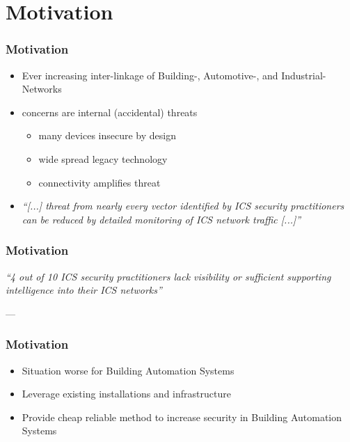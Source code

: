 
\section{Motivation}
\begin{frame}[c]
	\frametitle{Motivation}
	\begin{itemize}
		\item Ever increasing inter-linkage of Building-, Automotive-, and Industrial-Networks
		\item concerns are internal (accidental) threats \parencite{Gregory-Brown2017}
			\begin{itemize}
				\item many devices insecure by design
				\item wide spread legacy technology
				\item connectivity amplifies threat
			\end{itemize}
		\item \textit{\enquote{[...] threat from nearly every vector identified by ICS security practitioners
			can be reduced by detailed monitoring of ICS network traffic [...]}} \parencite{Gregory-Brown2017}
	\end{itemize}
	
	\note{}
\end{frame}

\begin{frame}[c]
	\frametitle{Motivation}
	\textit{\enquote{4 out of 10 ICS security practitioners lack visibility or sufficient supporting intelligence into their ICS networks}}
	
	\hspace{60mm} --- \textcite{Gregory-Brown2017}
\end{frame}

\begin{frame}[c]
	\frametitle{Motivation}
	\begin{itemize}
		\item Situation worse for Building Automation Systems
		\item Leverage existing installations and infrastructure
		\item Provide cheap reliable method to increase security in Building Automation Systems
	\end{itemize}
\end{frame}

